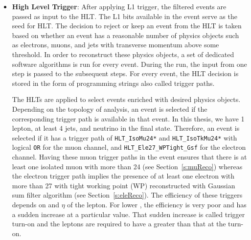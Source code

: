 \begin{itemize} [leftmargin=*]
\item \textbf{High Level Trigger}: After applying L1 trigger, the filtered events
are passed as input to the HLT. The L1 bits available in the event serve
as the seed for HLT. The decision to reject or keep an event from the HLT
is taken based on whether an event has a reasonable number of physics objects
such as electrons, muons, and jets  with transverse momentum above some
threshold. In order to reconstruct these physics objects, a set of dedicated
software algorithms is run for every event. During the run, the input from one 
step is passed to the subsequent steps. For every event, the HLT decision is 
stored in the form of programming strings also called trigger paths. 

The HLTs are applied to select events enriched
with desired physics objects. Depending on the topology of analysis, an 
event is selected if the corresponding trigger path is available in that 
event. In this thesis, we have 1 lepton, at least 4 jets, and neutrino in the 
final state. Therefore, an event is selected if it has a trigger 
path of \verb|HLT_IsoMu24*| and \verb|HLT_IsoTkMu24*| with logical \verb|OR| 
for the muon channel, and \verb|HLT_Ele27_WPTight_Gsf| for the electron 
channel. Having these muon trigger paths in the event ensures that there is at least one 
isolated muon with \pt more than 24 \GeV (see Section~\ref{s:muReco}) whereas
the electron trigger path implies the presence of at least one electron with \pt 
more than 27 \GeV with tight working point (WP) reconstructed with Gaussian sum 
filter algorithm (see Section~\ref{s:eleReco}). The efficiency of these triggers depends on 
\pt and $\eta$ of the lepton. For lower \pt, the efficiency is very poor and has 
a sudden increase at a particular value. That sudden increase is called trigger 
turn-on and the leptons are required to have a \pt greater than that at the turn-on.


\end{itemize}
